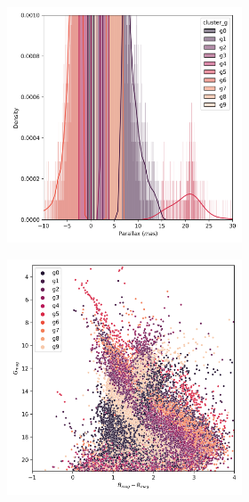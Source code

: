 \documentclass[11pt, a4paper, english]{book}
\begin{document}
\begin{figure}[H]
\begin{subfigure}{0.9\textwidth}
\begin{subfigure}[t]{0.30\textwidth}
    \end{subfigure}
    \hfill
    \begin{subfigure}[t]{0.30\textwidth}
      \centering
      \includegraphics[width=\textwidth]{../figures/melotte_25/kmeans_parallax_melotte_25.png}
    \end{subfigure}
    \hfill
    \begin{subfigure}[t]{0.30\textwidth}
      \centering
      \includegraphics[width=\textwidth]{../figures/melotte_25/kmeans_hr_diagram_melotte_25.png}

\end{subfigure}
\end{subfigure}
\end{figure}
\end{document}
